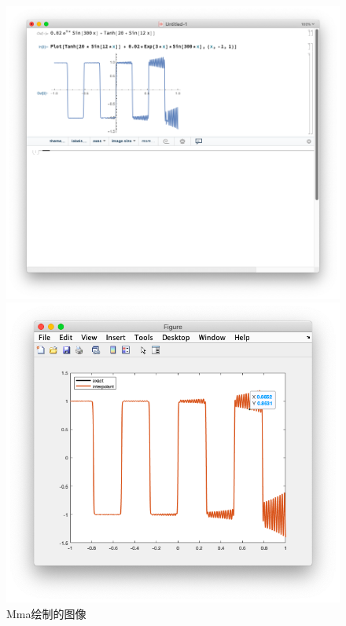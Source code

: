 \documentclass[]{report}
\begin{document}
		\begin{figure}[h!]
			\centering
			\begin{minipage}{13em}
				\centering
				\includegraphics[scale = 0.14]{images/1_1_4_mma.png}
				\caption{Mma绘制的图像}
			\end{minipage}
			\begin{minipage}{13em}
				\centering
				\includegraphics[scale = 0.2]{images/1_1_4_plot.png}

\end{minipage}
\end{figure}
\end{document}
